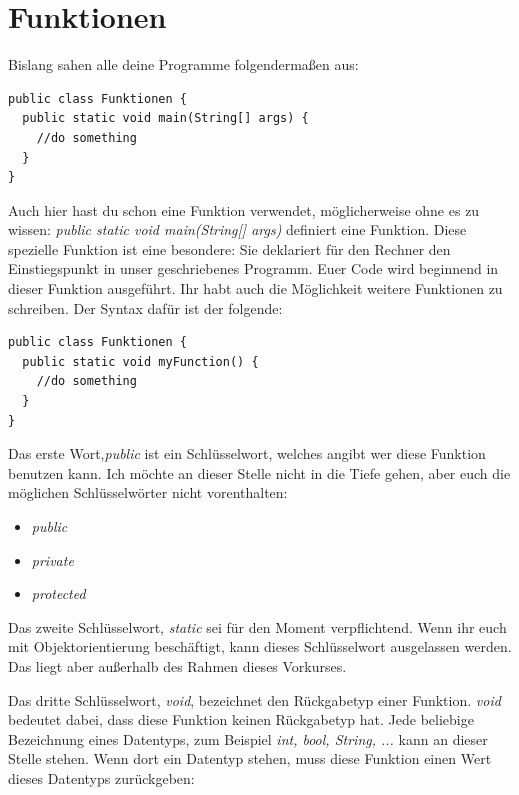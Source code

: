 \chapter{Funktionen}

Bislang sahen alle deine Programme folgendermaßen aus:

\begin{minipage}{\textwidth}
\begin{lstlisting}
public class Funktionen {
  public static void main(String[] args) {
    //do something
  }
}
\end{lstlisting}
\end{minipage}

Auch hier hast du schon eine Funktion verwendet, möglicherweise ohne es zu wissen: \textit{public static void main(String[] args)} definiert eine Funktion. Diese spezielle Funktion ist eine besondere: Sie deklariert für den Rechner den Einstiegspunkt in unser geschriebenes Programm. Euer Code wird beginnend in dieser Funktion ausgeführt. Ihr habt auch die Möglichkeit weitere Funktionen zu schreiben. Der Syntax dafür ist der folgende:

\begin{minipage}{\textwidth}
\begin{lstlisting}
public class Funktionen {
  public static void myFunction() {
    //do something
  }
}
\end{lstlisting}
\end{minipage}

Das erste Wort,\textit{public} ist ein Schlüsselwort, welches angibt wer diese Funktion benutzen kann. Ich möchte an dieser Stelle nicht in die Tiefe gehen, aber euch die möglichen Schlüsselwörter nicht vorenthalten:

\begin{itemize}
	\item \textit{public}
	\item \textit{private}
	\item \textit{protected}
\end{itemize}

Das zweite Schlüsselwort, \textit{static} sei für den Moment verpflichtend. Wenn ihr euch mit Objektorientierung beschäftigt, kann dieses Schlüsselwort ausgelassen werden. Das liegt aber außerhalb des Rahmen dieses Vorkurses.

Das dritte Schlüsselwort, \textit{void}, bezeichnet den Rückgabetyp einer Funktion. \textit{void} bedeutet dabei, dass diese Funktion keinen Rückgabetyp hat. Jede beliebige Bezeichnung eines Datentyps, zum Beispiel \textit{int, bool, String, ...} kann an dieser Stelle stehen. Wenn dort ein Datentyp stehen, muss diese Funktion einen Wert dieses Datentyps zurückgeben:


